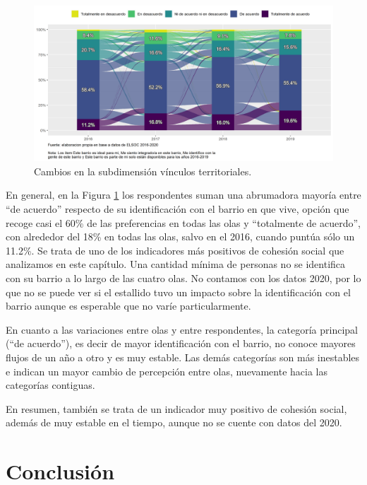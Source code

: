 \documentclass[
  12pt,
]{book}
\begin{document}
\begin{figure}[H]

{\centering \includegraphics[width=1\linewidth,height=1\textheight]{output/graphs/alluvial_cohesion_territorial} 

}

\caption{Cambios en la subdimensión vínculos territoriales.}\label{fig:alluvial-cohesion-territorial}
\end{figure}

En general, en la Figura \ref{fig:alluvial-cohesion-territorial} los respondentes suman una abrumadora mayoría entre ``de acuerdo'' respecto de su identificación con el barrio en que vive, opción que recoge casi el 60\% de las preferencias en todas las olas y ``totalmente de acuerdo'', con alrededor del 18\% en todas las olas, salvo en el 2016, cuando puntúa sólo un 11.2\%. Se trata de uno de los indicadores más positivos de cohesión social que analizamos en este capítulo. Una cantidad mínima de personas no se identifica con su barrio a lo largo de las cuatro olas. No contamos con los datos 2020, por lo que no se puede ver si el estallido tuvo un impacto sobre la identificación con el barrio aunque es esperable que no varíe particularmente.

En cuanto a las variaciones entre olas y entre respondentes, la categoría principal (``de acuerdo''), es decir de mayor identificación con el barrio, no conoce mayores flujos de un año a otro y es muy estable. Las demás categorías son más inestables e indican un mayor cambio de percepción entre olas, nuevamente hacia las categorías contiguas.

En resumen, también se trata de un indicador muy positivo de cohesión social, además de muy estable en el tiempo, aunque no se cuente con datos del 2020.

\hypertarget{conclusiuxf3n}{%
\section{Conclusión}\label{conclusiuxf3n}}
\end{document}
